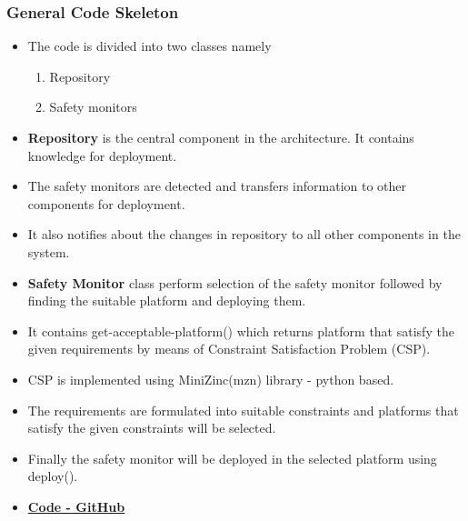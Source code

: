 \documentclass{beamer}
\begin{document}

\begin{frame}
        \frametitle{General Code Skeleton}
            \begin{itemize}
                \item The code is divided into two classes namely
                \begin{enumerate}
                    \item Repository
                    \item Safety monitors
                \end{enumerate}
                \item \textbf{Repository} is the central component in the architecture. It contains knowledge for deployment.
                \item The safety monitors are detected and transfers information to other components for deployment.
                \item It also notifies about the changes in repository to all other components in the system.
                \item \textbf{Safety Monitor} class perform selection of the safety monitor followed by finding the suitable platform and deploying them.
            \end{itemize}
    \end{frame}
    
\begin{frame}{}
    \begin{itemize}
        \item It contains get-acceptable-platform() which returns platform that satisfy the given requirements by means of Constraint Satisfaction Problem (CSP).
        \item CSP is implemented using MiniZinc(mzn) library - python based. 
        \item The requirements are formulated into suitable constraints and platforms that satisfy the given constraints will be selected.
        \item Finally the safety monitor will be deployed in the selected platform using deploy().
        \item \href{https://github.com/AshAswin/Adaptive-Deployment-of-Safety-Monitors-of-Autonomous-Systems/blob/Jithsaavvy-code-skeleton/code_skeleton.py}{\textbf{Code - GitHub}}
        
    \end{itemize}
    
\end{frame}
    
\end{document}
